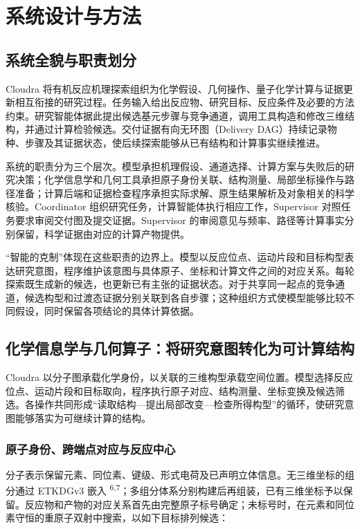 \section{系统设计与方法}

\subsection{系统全貌与职责划分}

Cloudra 将有机反应机理探索组织为化学假设、几何操作、量子化学计算与证据更新相互衔接的研究过程。任务输入给出反应物、研究目标、反应条件及必要的方法约束。研究智能体据此提出候选基元步骤与竞争通道，调用工具构造和修改三维结构，并通过计算检验候选。交付证据有向无环图（Delivery DAG）持续记录物种、步骤及其证据状态，使后续探索能够从已有结构和计算事实继续推进。

系统的职责分为三个层次。模型承担机理假设、通道选择、计算方案与失败后的研究决策；化学信息学和几何工具承担原子身份关联、结构测量、局部坐标操作与路径准备；计算后端和证据检查程序承担实际求解、原生结果解析及对象相关的科学核验。Coordinator 组织研究任务，计算智能体执行相应工作，Supervisor 对照任务要求审阅交付图及提交证据。Supervisor 的审阅意见与频率、路径等计算事实分别保留，科学证据由对应的计算产物提供。

“智能的克制”体现在这些职责的边界上。模型以反应位点、运动片段和目标构型表达研究意图，程序维护该意图与具体原子、坐标和计算文件之间的对应关系。每轮探索既生成新的候选，也更新已有主张的证据状态。对于共享同一起点的竞争通道，候选构型和过渡态证据分别关联到各自步骤；这种组织方式使模型能够比较不同假设，同时保留各项结论的具体计算依据。

\subsection{化学信息学与几何算子：将研究意图转化为可计算结构}

Cloudra 以分子图承载化学身份，以关联的三维构型承载空间位置。模型选择反应位点、运动片段和目标取向，程序执行原子对应、结构测量、坐标变换及候选筛选。各操作共同形成“读取结构—提出局部改变—检查所得构型”的循环，使研究意图能够落实为可继续计算的结构。

\subsubsection{原子身份、跨端点对应与反应中心}

分子表示保留元素、同位素、键级、形式电荷及已声明立体信息。无三维坐标的组分通过 ETKDGv3 嵌入 \textsuperscript{6,7}；多组分体系分别构建后再组装，已有三维坐标予以保留。反应物和产物的对应关系首先由完整原子标号确定；未标号时，在元素和同位素守恒的重原子双射中搜索，以如下目标排列候选：


